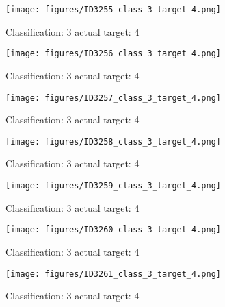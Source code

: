 \begin{figure}[h!]
\begin{center}
\texttt{[image: figures/ID3255\_class\_3\_target\_4.png]}
\end{center}
\caption{ Classification: 3 actual target: 4}
\label{fig:ID3255_class_3_target_4}
\end{figure}
\begin{figure}[h!]
\begin{center}
\texttt{[image: figures/ID3256\_class\_3\_target\_4.png]}
\end{center}
\caption{ Classification: 3 actual target: 4}
\label{fig:ID3256_class_3_target_4}
\end{figure}
\begin{figure}[h!]
\begin{center}
\texttt{[image: figures/ID3257\_class\_3\_target\_4.png]}
\end{center}
\caption{ Classification: 3 actual target: 4}
\label{fig:ID3257_class_3_target_4}
\end{figure}
\begin{figure}[h!]
\begin{center}
\texttt{[image: figures/ID3258\_class\_3\_target\_4.png]}
\end{center}
\caption{ Classification: 3 actual target: 4}
\label{fig:ID3258_class_3_target_4}
\end{figure}
\begin{figure}[h!]
\begin{center}
\texttt{[image: figures/ID3259\_class\_3\_target\_4.png]}
\end{center}
\caption{ Classification: 3 actual target: 4}
\label{fig:ID3259_class_3_target_4}
\end{figure}
\begin{figure}[h!]
\begin{center}
\texttt{[image: figures/ID3260\_class\_3\_target\_4.png]}
\end{center}
\caption{ Classification: 3 actual target: 4}
\label{fig:ID3260_class_3_target_4}
\end{figure}
\begin{figure}[h!]
\begin{center}
\texttt{[image: figures/ID3261\_class\_3\_target\_4.png]}
\end{center}
\caption{ Classification: 3 actual target: 4}
\label{fig:ID3261_class_3_target_4}
\end{figure}
